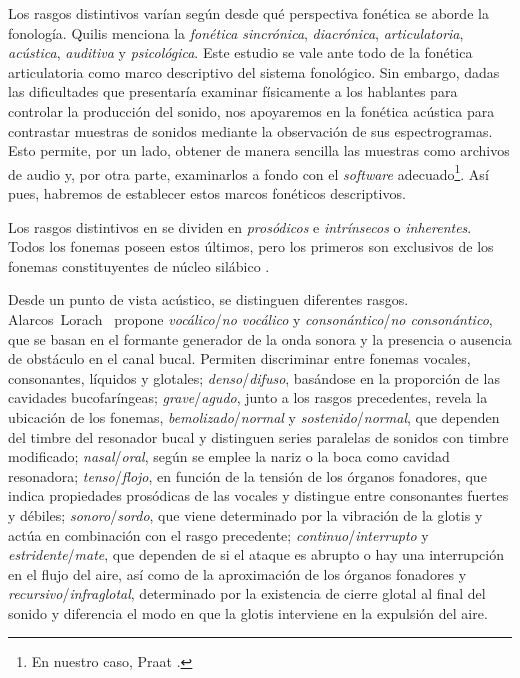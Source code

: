 Los rasgos distintivos varían según desde qué perspectiva fonética se aborde la fonología. Quilis \parencite*[44]{quilis2019} menciona la \textit{fonética sincrónica}, \textit{diacrónica}, \textit{articulatoria}, \textit{acústica}, \textit{auditiva} y \textit{psicológica}. Este estudio se vale ante todo de la fonética articulatoria como marco descriptivo del sistema fonológico. Sin embargo, dadas las dificultades que presentaría examinar físicamente a los hablantes para controlar la producción del sonido, nos apoyaremos en la fonética acústica para contrastar muestras de sonidos mediante la observación de sus espectrogramas. Esto permite, por un lado, obtener de manera sencilla las muestras como archivos de audio y, por otra parte, examinarlos a fondo con el \textit{software} adecuado\footnote{En nuestro caso, Praat \parencite{boersma2022}.}. Así pues, habremos de establecer estos marcos fonéticos descriptivos. 

Los rasgos distintivos en se dividen en \textit{prosódicos} e \textit{intrínsecos} o \textit{inherentes}. Todos los fonemas poseen estos últimos, pero los primeros son exclusivos de los fonemas constituyentes de núcleo silábico \parencite[111]{quilis2019}.

Desde un punto de vista acústico, se distinguen diferentes rasgos. Alarcos~Lorach~\parencite*[85]{alarcos1964} propone \textit{vocálico}/\textit{no vocálico} y \textit{consonántico}/\textit{no consonántico}, que se basan en el formante generador de la onda sonora y la presencia o ausencia de obstáculo en el canal bucal. Permiten discriminar entre fonemas vocales, consonantes, líquidos y glotales;  \textit{denso}/\textit{difuso}, basándose en la proporción de las cavidades bucofaríngeas; \textit{grave}/\textit{agudo}, junto a los rasgos precedentes,  revela la ubicación de los fonemas, \textit{bemolizado}/\textit{normal} y  \textit{sostenido}/\textit{normal}, que dependen del timbre del resonador bucal y distinguen series paralelas de sonidos con timbre modificado; \textit{nasal}/\textit{oral}, según se emplee la nariz o la boca como cavidad resonadora; \textit{tenso}/\textit{flojo}, en función de la tensión de los órganos fonadores, que indica propiedades prosódicas de las vocales y distingue entre consonantes fuertes y débiles;  \textit{sonoro}/\textit{sordo}, que viene determinado por la vibración de la glotis y actúa en combinación con el rasgo precedente; \textit{continuo}/\textit{interrupto} y  \textit{estridente}/\textit{mate}, que dependen de si el ataque es abrupto o hay una interrupción en el flujo del aire, así como de la aproximación de los órganos fonadores y \textit{recursivo}/\textit{infraglotal}, determinado por la existencia de cierre glotal al final del sonido y diferencia el modo en que la glotis interviene en la expulsión del aire. 

